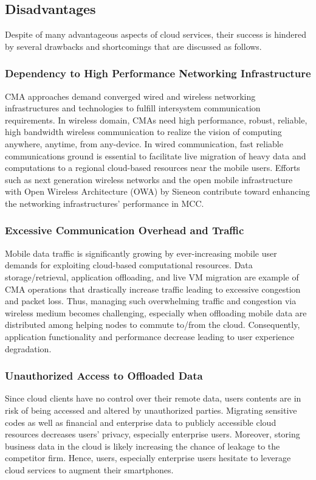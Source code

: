 \documentclass[publish]{IEEEtran}
\begin{document}
\subsection{Disadvantages}
Despite of many advantageous aspects of cloud services, their success is hindered by several drawbacks and shortcomings that are discussed as follows.

\subsubsection{Dependency to High Performance Networking Infrastructure}
CMA approaches demand converged wired and wireless networking infrastructures and technologies to fulfill intersystem communication requirements. In wireless domain, CMAs need high performance, robust, reliable, high bandwidth wireless communication to realize the vision of computing anywhere, anytime, from any-device. In wired communication, fast reliable communications ground is essential to facilitate live migration of heavy data and computations to a regional cloud-based resources near the mobile users. Efforts such as next generation wireless networks \cite{Nasser2006} and the open mobile infrastructure \cite{OWA2011} with Open Wireless Architecture (OWA) by Sieneon \cite{sieneon} contribute toward enhancing the networking infrastructures' performance in MCC.

\subsubsection{Excessive Communication Overhead and Traffic}
Mobile data traffic is significantly growing by ever-increasing mobile user demands for exploiting cloud-based computational resources. Data storage/retrieval, application offloading, and live VM migration are example of CMA operations that drastically increase traffic leading to excessive congestion and packet loss. Thus, managing such overwhelming traffic and congestion via wireless medium becomes challenging, especially when offloading mobile data are distributed among helping nodes to commute to/from the cloud. Consequently, application functionality and performance decrease leading to user experience degradation.

\subsubsection{Unauthorized Access to Offloaded Data}
Since cloud clients have no control over their remote data, users contents are in risk of being accessed and altered by unauthorized parties. Migrating sensitive codes as well as financial and enterprise data to publicly accessible cloud resources decreases users’ privacy, especially enterprise users. Moreover, storing business data in the cloud is likely increasing the chance of leakage to the competitor firm. Hence, users, especially enterprise users hesitate to leverage cloud services to augment their smartphones.
\end{document}
